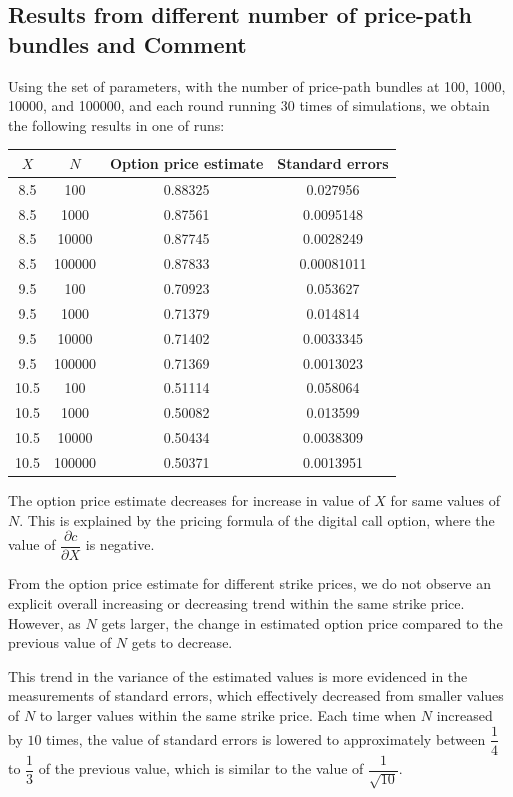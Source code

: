 \subsection{Results from different number of price-path bundles and Comment}

Using the set of parameters, with the number of price-path bundles at 100, 1000, 10000, and 100000, and each round running 30 times of simulations, we obtain the following results in one of runs:

\begin{center}
	\begin{tabular}{| c | c | c | c |}
		\hline $X$ & $N$ & Option price estimate & Standard errors\\
		[0.5ex]
		\hline 8.5 & 100 & 0.88325 & 0.027956\\
		\hline 8.5 & 1000 & 0.87561 & 0.0095148\\
		\hline 8.5 & 10000 & 0.87745 & 0.0028249\\
		\hline 8.5 & 100000 & 0.87833 & 0.00081011\\
		\hline
		\hline 9.5 & 100 & 0.70923 & 0.053627\\
		\hline 9.5 & 1000 & 0.71379 & 0.014814\\
		\hline 9.5 & 10000 & 0.71402 & 0.0033345\\
		\hline 9.5 & 100000 & 0.71369 & 0.0013023\\
		\hline
		\hline 10.5 & 100 & 0.51114 & 0.058064\\
		\hline 10.5 & 1000 & 0.50082 & 0.013599\\
		\hline 10.5 & 10000 & 0.50434 & 0.0038309\\
		\hline 10.5 & 100000 & 0.50371 & 0.0013951\\
		\hline
	\end{tabular}
\end{center}

The option price estimate decreases for increase in value of $X$ for same values of $N$. This is explained by the pricing formula of the digital call option, where the value of $\dfrac{\partial c}{\partial X}$ is negative.

From the option price estimate for different strike prices, we do not observe an explicit overall increasing or decreasing trend within the same strike price. However, as $N$ gets larger, the change in estimated option price compared to the previous value of $N$ gets to decrease. 

This trend in the variance of the estimated values is more evidenced in the measurements of standard errors, which effectively decreased from smaller values of $N$ to larger values within the same strike price. Each time when $N$ increased by $10$ times, the value of standard errors is lowered to approximately between $\dfrac{1}{4}$ to $\dfrac{1}{3}$ of the previous value, which is similar to the value of $\dfrac{1}{\sqrt{10}}$.

